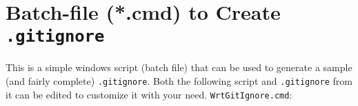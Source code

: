 \documentclass[12pt, letterpaper, journal, draftclsnofoot, technote, onecolumn]{IEEEtran}
\begin{document}
\section{Batch-file (*.cmd) to Create \texttt{.gitignore}}
\label{app:ignore-cmd}
This is a simple windows script (batch file) that can be used to generate a sample (and fairly complete) \texttt{.gitignore}. Both the following script  and \texttt{.gitignore} from it can be edited to customize it with your need. 
%
%
\texttt{WrtGitIgnore.cmd}:
\begin{singlespace}
	
\end{singlespace}

\end{document}
